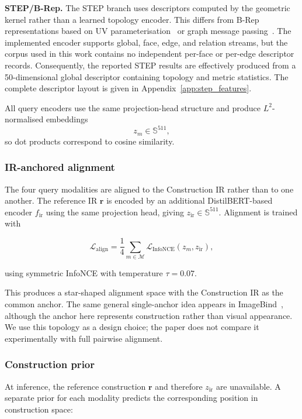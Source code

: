 \documentclass[preprint,12pt]{elsarticle}
\begin{document}
\textbf{STEP/B-Rep.}
The STEP branch uses descriptors computed by the geometric kernel rather than
a learned topology encoder. This differs from B-Rep representations based on
UV parameterisation~\cite{jayaraman2021uvnet} or graph message
passing~\cite{lambourne2021brepnet}. The implemented encoder supports global,
face, edge, and relation streams, but the corpus used in this work contains no
independent per-face or per-edge descriptor records. Consequently, the
reported STEP results are effectively produced from a 50-dimensional global
descriptor containing topology and metric statistics. The complete descriptor
layout is given in Appendix~\ref{app:step_features}.

All query encoders use the same projection-head structure and produce
$L^2$-normalised embeddings
\[
  z_m \in \mathbb{S}^{511},
\]
so dot products correspond to cosine similarity.


\subsubsection{IR-anchored alignment}
\label{sec:alignment}

The four query modalities are aligned to the Construction IR rather than to
one another. The reference IR $\mathbf{r}$ is encoded by an additional
DistilBERT-based encoder $f_{\mathrm{ir}}$ using the same projection head,
giving $z_{\mathrm{ir}} \in \mathbb{S}^{511}$. Alignment is trained with

\begin{equation}
  \mathcal{L}_{\mathrm{align}}
  =
  \frac{1}{4}
  \sum_{m\in\mathcal{M}}
  \mathcal{L}_{\mathrm{InfoNCE}}
  (z_m,z_{\mathrm{ir}}),
\end{equation}

using symmetric InfoNCE with temperature $\tau=0.07$.

This produces a star-shaped alignment space with the Construction IR as the
common anchor. The same general single-anchor idea appears in
ImageBind~\cite{girdhar2023imagebind}, although the anchor here represents
construction rather than visual appearance. We use this topology as a design
choice; the paper does not compare it experimentally with full pairwise
alignment.


\subsubsection{Construction prior}
\label{sec:priors}

At inference, the reference construction $\mathbf{r}$ and therefore
$z_{\mathrm{ir}}$ are unavailable. A separate prior for each modality predicts
the corresponding position in construction space:
\end{document}
